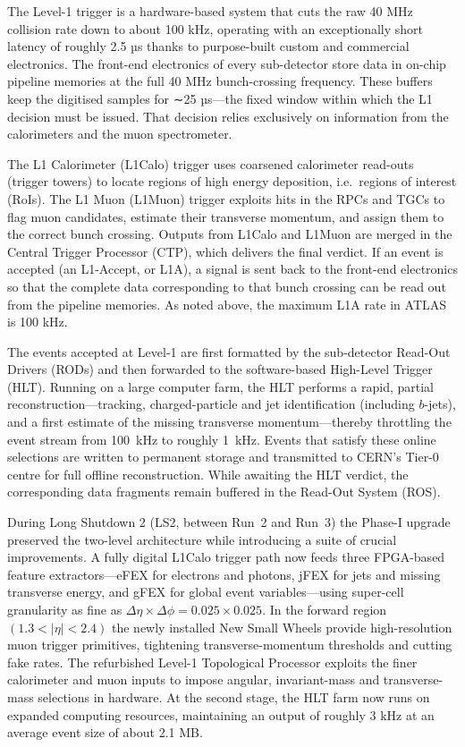 The Level-1 trigger is a hardware-based system that cuts the raw 40 MHz collision rate down to about 100 kHz, operating with an exceptionally short latency of roughly 2.5 µs thanks to purpose-built custom and commercial electronics. The front-end electronics of every sub-detector store data in on-chip pipeline memories at the full 40 MHz bunch-crossing frequency. These buffers keep the digitised samples for ∼25 µs—the fixed window within which the L1 decision must be issued. That decision relies exclusively on information from the calorimeters and the muon spectrometer.

The L1 Calorimeter (L1Calo) trigger uses coarsened calorimeter read-outs (trigger towers) to locate regions of high energy deposition, i.e.\ regions of interest (RoIs). The L1 Muon (L1Muon) trigger exploits hits in the RPCs and TGCs to flag muon candidates, estimate their transverse momentum, and assign them to the correct bunch crossing. Outputs from L1Calo and L1Muon are merged in the Central Trigger Processor (CTP), which delivers the final verdict. If an event is accepted (an L1-Accept, or L1A), a signal is sent back to the front-end electronics so that the complete data corresponding to that bunch crossing can be read out from the pipeline memories. As noted above, the maximum L1A rate in ATLAS is 100 kHz.

The events accepted at Level-1 are first formatted by the sub-detector Read-Out Drivers (RODs) and then forwarded to the software-based High-Level Trigger (HLT). Running on a large computer farm, the HLT performs a rapid, partial reconstruction—tracking, charged-particle and jet identification (including $b$-jets), and a first estimate of the missing transverse momentum—thereby throttling the event stream from \SI{100}{\kilo\hertz} to roughly \SI{1}{\kilo\hertz}. Events that satisfy these online selections are written to permanent storage and transmitted to CERN’s Tier-0 centre for full offline reconstruction. While awaiting the HLT verdict, the corresponding data fragments remain buffered in the Read-Out System (ROS).

During Long Shutdown 2 (LS2, between Run~2 and Run~3) the Phase-I upgrade preserved the two-level architecture while introducing a suite of crucial improvements. A fully digital L1Calo trigger path now feeds three FPGA-based feature extractors—eFEX for electrons and photons, jFEX for jets and missing transverse energy, and gFEX for global event variables—using super-cell granularity as fine as $\Delta\eta\times\Delta\phi = 0.025\times0.025$. In the forward region $(1.3<|\eta|<2.4)$ the newly installed New Small Wheels provide high-resolution muon trigger primitives, tightening transverse-momentum thresholds and cutting fake rates. The refurbished Level-1 Topological Processor exploits the finer calorimeter and muon inputs to impose angular, invariant-mass and transverse-mass selections in hardware. At the second stage, the HLT farm now runs on expanded computing resources, maintaining an output of roughly 3 kHz at an average event size of about 2.1 MB.

